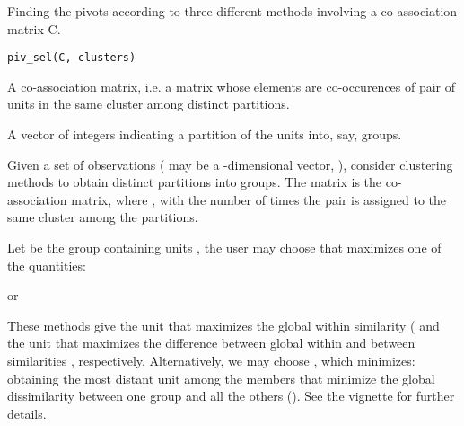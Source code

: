 \documentclass[a4paper]{book}
\begin{document}
%
\begin{Description}\relax
Finding the pivots according to three different
methods involving a co-association matrix C.
\end{Description}
%
\begin{Usage}
\begin{verbatim}
piv_sel(C, clusters)
\end{verbatim}
\end{Usage}
%
\begin{Arguments}
\begin{ldescription}
\item[\code{C}] A  co-association matrix, i.e.
a matrix whose elements are co-occurences of pair of units
in the same cluster among  distinct partitions.

\item[\code{clusters}] A vector of integers indicating
a partition of the  units into, say,  groups.
\end{ldescription}
\end{Arguments}
%
\begin{Details}\relax
Given a set of  observations 
( may be a -dimensional vector, ),
consider clustering methods to obtain  distinct partitions
into  groups.
The matrix  is the co-association matrix,
where , with  the number of times
the pair  is assigned to the same
cluster among the  partitions.

Let  be the group containing units ,
the user may choose  that
maximizes one of the quantities:

or

These methods give the unit that maximizes the global
within similarity ( and the unit that
maximizes the difference between global within and
between similarities , respectively.
Alternatively, we may choose , which minimizes:
obtaining the most distant unit among the members
that minimize the global dissimilarity between one group
and all the others ().
See the vignette for further details.
\end{Details}
\end{document}
